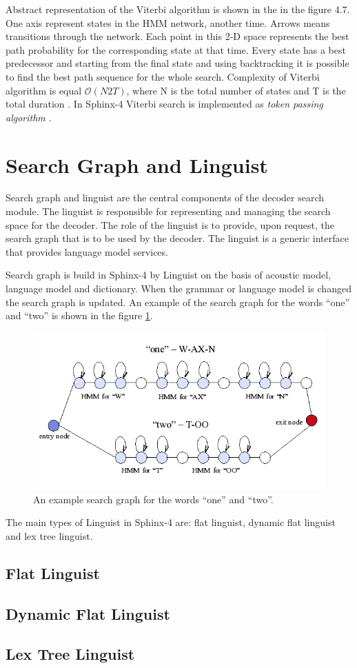 Abstract representation of the Viterbi algorithm is shown in the in the figure 4.7. One axis represent states in the HMM network, another time.
 Arrows means transitions through the network. Each point in this 2-D space represents the best path probability for the corresponding state at that time. 
 Every state has a best predecessor and starting from the final state and using backtracking it is possible to find the best path sequence for the whole search.
Complexity of Viterbi algorithm is equal $\mathcal{O}(N2T)$, where N
is the total number of states and T is the total duration \parencite
{Ravishankar96efficientalgorithms}. In Sphinx-4 Viterbi search is implemented as
\textit {token passing algorithm} \parencite {Young89Token}. 

\section {Search Graph and Linguist} 

Search graph and linguist are the central components of the decoder search
module.  The linguist is responsible for representing and managing the search
space for the decoder. The role of the linguist is to provide, upon request, the search graph that is to be used by the decoder.
The linguist is a generic interface that provides language model services.

Search graph is build in Sphinx-4 by Linguist on the basis of acoustic
model, language model and dictionary. When the grammar or language model is changed the
search graph is updated.  An example of the search graph for the words ``one''
and ``two'' is shown in the figure \ref{fig:hmm}.

\begin{figure}[htbp]
  \centering
    \includegraphics[width=1.0\textwidth]{images/hmm.png}
 \caption{An example search graph for the words ``one'' and ``two''.}
  \label{fig:hmm}
\end {figure}

The main types of Linguist in Sphinx-4 are: flat linguist, dynamic flat linguist
and lex tree linguist. 

\subsection {Flat Linguist} 
\subsection {Dynamic Flat Linguist} 
\subsection {Lex Tree Linguist} 









